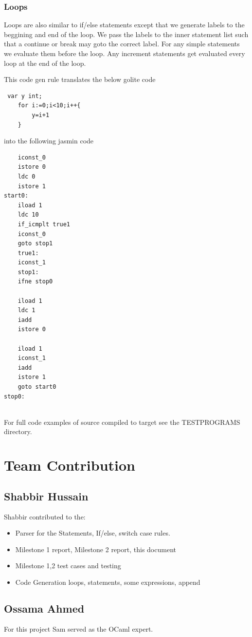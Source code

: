 \documentclass{article}
\begin{document}
\subsubsection*{Loops}
Loops are also similar to if/else statements except that we generate labels to the beggining and end of the loop. We pass the labels to the inner statement list such that a continue or break may goto the correct label. For any simple statements we evaluate them before the loop. Any increment statements get evaluated every loop at the end of the loop.

This code gen rule translates the below golite code
\begin{lstlisting}
 var y int;
    for i:=0;i<10;i++{
        y=i+1
    }

\end{lstlisting}
into the following jasmin code
\begin{lstlisting}
	iconst_0
	istore 0
	ldc 0
	istore 1
start0:
	iload 1
	ldc 10
	if_icmplt true1
	iconst_0
	goto stop1
	true1:
	iconst_1
	stop1:
	ifne stop0

	iload 1
	ldc 1
	iadd
	istore 0
	
	iload 1
	iconst_1
	iadd
	istore 1
	goto start0
stop0:


\end{lstlisting}

For full code examples of source compiled to target see the TESTPROGRAMS directory.

\section{Team Contribution}

\subsection{Shabbir Hussain}
Shabbir contributed to the:
\begin{itemize}
\item Parser for the Statements, If/else, switch case rules.
\item Milestone 1 report, Milestone 2 report, this document
\item Milestone 1,2 test cases and testing
\item Code Generation loops, statements, some expressions, append
\end{itemize}

\subsection{Ossama Ahmed}
For this project Sam served as the OCaml expert. 
	
\end{document}
